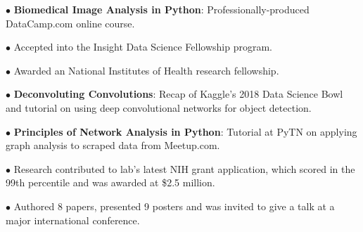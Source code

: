 \documentclass{tccv}
\begin{document}
\begin{factlist}
    
    \item{$\bullet$}
         {\textbf{Biomedical Image Analysis in Python}: Professionally-produced DataCamp.com online course. \href{https://www.datacamp.com/courses/biomedical-image-analysis-in-python}{\color{blue}\Mundus}} 
         
    \item{$\bullet$}
         {Accepted into the Insight Data Science Fellowship program.}
    
    \item{$\bullet$}
         {Awarded an National Institutes of Health research fellowship. \href{https://projectreporter.nih.gov/project_info_description.cfm?aid=9328269&icde=35806628}{\color{blue}\Mundus}}
         
    \item{$\bullet$}
        {\textbf{Deconvoluting Convolutions}: Recap of Kaggle's 2018 Data Science Bowl and tutorial on using deep convolutional networks for object detection.   \href{https://github.com/stkbailey/deconv-conv/blob/master/slides.pdf}{\textcolor{blue}\Mundus}}
     
    \item{$\bullet$}
        {\textbf{Principles of Network Analysis in Python}: Tutorial at PyTN on applying graph analysis to scraped data from Meetup.com. \href{https://github.com/stkbailey/nashnetx/blob/master/slides/PopularPythonistas_v3_PyTN.pdf}{\textcolor{blue}\Mundus}}
        
    \item{$\bullet$}
        {Research contributed to lab's latest NIH grant application, which scored in the 99th percentile and was awarded at \$2.5 million.}
         
    \item{$\bullet$}
         {Authored 8 papers, presented 9 posters and was invited to give a talk at a major international conference. \href{https://scholar.google.com/citations?user=s3nPF1MAAAAJ&hl=en}{\color{blue}\Mundus}}


\end{factlist}
\end{document}
